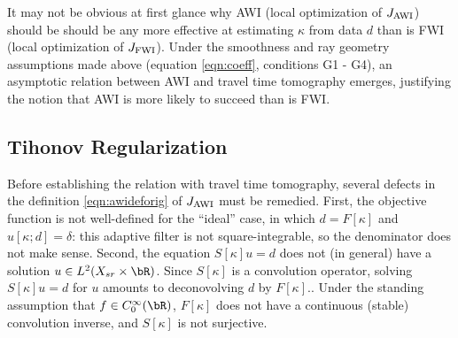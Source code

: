It may not be obvious at first glance why AWI (local optimization of
$J_{\rm AWI}$) should be should be any more effective at estimating
$\kappa$ from data $d$ than is FWI (local
optimization of $J_{\rm FWI}$). Under the smoothness and ray geometry assumptions made above (equation
\ref{eqn:coeff}, conditions G1 - G4), an asymptotic relation
between AWI and travel time tomography emerges, justifying the notion
that AWI is more likely to succeed than is FWI.



\subsection{Tihonov Regularization}
Before establishing the relation with travel time tomography, several
defects in the definition \ref{eqn:awideforig} of $J_{\rm AWI}$ must be
remedied. First, the objective function is not well-defined for the
``ideal'' case, in which $d = F[\kappa]$ and $u[\kappa;d]=\delta$:
this adaptive filter is not square-integrable, so the denominator does
not make sense. Second, the equation $S[\kappa]u=d$ does not (in
general) have a solution $u \in L^2(X_{sr} \times \bR)$. Since
$S[\kappa]$ is a convolution operator, solving $S[\kappa]u=d$ for $u$
amounts to deconovolving $d$ by $F[\kappa]$..  Under the standing
assumption that $f \in C^{\infty}_0(\bR)$, $F[\kappa]$ does not have a continuous
(stable) convolution inverse, and $S[\kappa]$ is not surjective.

